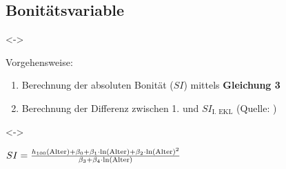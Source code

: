 \subsection{Bonitätsvariable}

\begin{frame}[c]
  \visible<\theFirstElement->{Vorgehensweise:
  \begin{enumerate}
  \item Berechnung der absoluten Bonität (\(SI\)) mittels \textbf{Gleichung 3}
  \item Berechnung der Differenz zwischen 1. und \(SI_{\text{I. EKL}}\) (Quelle: \Schober{})
  \end{enumerate}}

  \visible<\theFirstElement->{\begin{center}
      \begin{minipage}{0.5\linewidth}
        \centerline{\(SI = \frac{h_{100}(\text{Alter}) + \beta_0 + \beta_1 \cdot \ln(\text{Alter}) + \beta_2 \cdot \ln(\text{Alter})^2 }{\beta_3 + \beta_4 \cdot \ln(\text{Alter})}{}\)}
        \vspace{\captiondistance}
      \end{minipage}
    \end{center}}
\end{frame}

